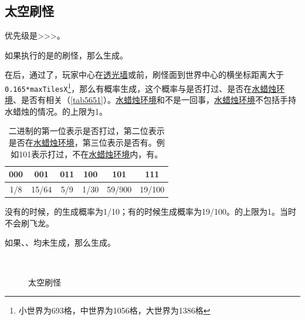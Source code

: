 \subsection{太空刷怪}
优先级是>>>。

如果执行的是的刷怪，那么生成。

在后，通过了，玩家中心在\hyperref[app9]{透光墙}或前，刷怪面到世界中心的横坐标距离大于\lstinline{0.165*maxTilesX}\footnote{小世界为693格，中世界为1056格，大世界为1386格}，那么有概率生成，这个概率与是否打过、是否在\hyperref[app37]{水蜡烛环境}、是否有相关（\autoref{tab5651}）。\hyperref[app37]{水蜡烛环境}和不是一回事，\hyperref[app37]{水蜡烛环境}不包括手持水蜡烛的情况。的上限为1。

\begin{table}[!ht]
    \centering
    \begin{tabular}{cccccc}
         000&001&011&100&101&111\\\hline
         1/8&15/64&5/9&1/30&59/900&19/100 
    \end{tabular}
    \caption{二进制的第一位表示是否打过，第二位表示是否在\hyperref[app37]{水蜡烛环境}，第三位表示是否有。例如101表示打过，不在\hyperref[app37]{水蜡烛环境}内，有。}
    \label{tab5651}
\end{table}

没有的时候，的生成概率为1/10；有的时候生成概率为19/100。的上限为1。当时不会刷飞龙。

如果、、均未生成，那么生成。
\begin{figure}[!ht]
    \centering
    \\
    \caption{太空刷怪}
\end{figure}

